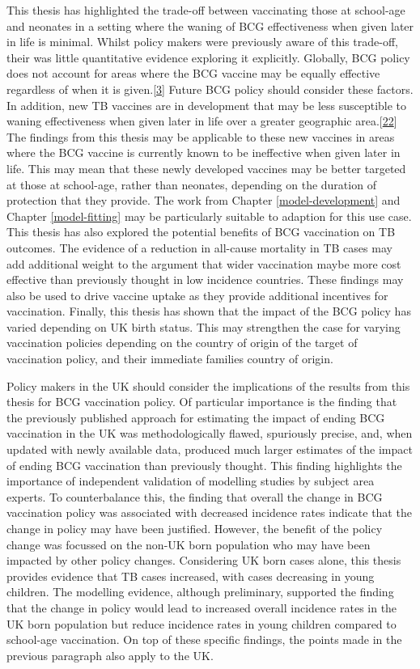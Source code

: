\documentclass[11pt,twoside]{bristolthesis}
\begin{document}
  This thesis has highlighted the trade-off between vaccinating those at school-age and neonates in a setting where the waning of BCG effectiveness when given later in life is minimal. Whilst policy makers were previously aware of this trade-off, their was little quantitative evidence exploring it explicitly. Globally, BCG policy does not account for areas where the BCG vaccine may be equally effective regardless of when it is given.{[}\protect\hyperlink{ref-TheWorldHealthOrganization:2018va}{3}{]} Future BCG policy should consider these factors. In addition, new TB vaccines are in development that may be less susceptible to waning effectiveness when given later in life over a greater geographic area.{[}\protect\hyperlink{ref-Medicine2013}{22}{]} The findings from this thesis may be applicable to these new vaccines in areas where the BCG vaccine is currently known to be ineffective when given later in life. This may mean that these newly developed vaccines may be better targeted at those at school-age, rather than neonates, depending on the duration of protection that they provide. The work from Chapter \ref{model-development} and Chapter \ref{model-fitting} may be particularly suitable to adaption for this use case. This thesis has also explored the potential benefits of BCG vaccination on TB outcomes. The evidence of a reduction in all-cause mortality in TB cases may add additional weight to the argument that wider vaccination maybe more cost effective than previously thought in low incidence countries. These findings may also be used to drive vaccine uptake as they provide additional incentives for vaccination. Finally, this thesis has shown that the impact of the BCG policy has varied depending on UK birth status. This may strengthen the case for varying vaccination policies depending on the country of origin of the target of vaccination policy, and their immediate families country of origin.
  
  Policy makers in the UK should consider the implications of the results from this thesis for BCG vaccination policy. Of particular importance is the finding that the previously published approach for estimating the impact of ending BCG vaccination in the UK was methodologically flawed, spuriously precise, and, when updated with newly available data, produced much larger estimates of the impact of ending BCG vaccination than previously thought. This finding highlights the importance of independent validation of modelling studies by subject area experts. To counterbalance this, the finding that overall the change in BCG vaccination policy was associated with decreased incidence rates indicate that the change in policy may have been justified. However, the benefit of the policy change was focussed on the non-UK born population who may have been impacted by other policy changes. Considering UK born cases alone, this thesis provides evidence that TB cases increased, with cases decreasing in young children. The modelling evidence, although preliminary, supported the finding that the change in policy would lead to increased overall incidence rates in the UK born population but reduce incidence rates in young children compared to school-age vaccination. On top of these specific findings, the points made in the previous paragraph also apply to the UK.
  
\end{document}
